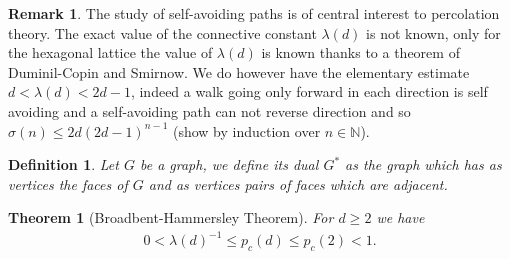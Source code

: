 \documentclass[12pt,a4paper]{article}
\newtheorem{thm}{Theorem}[section]
\newtheorem{defn}{Definition}[section]
\theoremstyle{definition}
\newtheorem{rem}{Remark}[section]
\begin{document}
\begin{rem} The study of self-avoiding paths is of central interest to percolation theory. The exact value of the connective constant $\lambda(d)$ is not known, only for the hexagonal lattice the value of $\lambda(d)$ is known thanks to a theorem of Duminil-Copin and Smirnow. We do however have the elementary estimate $d< \lambda(d) < 2d-1$, indeed a walk going only forward in each direction is self avoiding and a self-avoiding path can not reverse direction and so $\sigma(n) \leq 2d(2d-1)^{n-1}$ (show by induction over $n \in \mathbb{N}$). 
\end{rem}
\newpage
\begin{defn} Let $G$ be a graph, we define its dual $G^*$ as the graph which has as vertices the faces of $G$ and as vertices pairs of faces which are adjacent. 
\end{defn}
\begin{thm}[Broadbent-Hammersley Theorem] For $d\geq 2$ we have 
\begin{align*}
0 < \lambda(d)^{-1} \leq p_c(d) \leq p_c(2) < 1.
\end{align*}
\end{thm}
\end{document}
